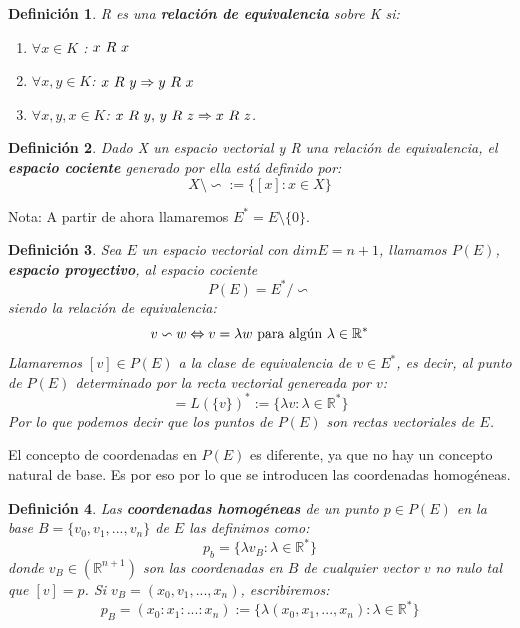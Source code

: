 \documentclass[a4paper,11pt, oneside]{book}
\newtheorem{defi}{Definición}
\begin{document}
\begin{defi}
	R es una \textbf{relación de equivalencia} sobre K si:
	\begin{enumerate}
	\item $\forall x \in K$	: $x\textup{ }R\textup{ }x$
	\item $\forall x,y \in K$: $x\textup{ }R\textup{ }y \Rightarrow y\textup{ }R\textup{ }x$
	\item $\forall x,y,x \in K$: $x\textup{ }R\textup{ }y \textup{, } y\textup{ }R\textup{ }z \Rightarrow x\textup{ }R\textup{ }z$.
	\end{enumerate}
\end{defi}

\begin{defi}
	Dado X un espacio vectorial y R una relación de equivalencia, el \textbf{espacio cociente} generado por ella está definido por:
	\begin{equation}
		X \setminus \backsim := \{[x]: x \in X\}
	\end{equation}
\end{defi}



Nota: A partir de ahora llamaremos $E^* = E \setminus \{0\}$.
\begin{defi}
	Sea $E$ un espacio vectorial con $dim E=n+1$, llamamos $P(E)$, \textbf{espacio proyectivo}, al espacio cociente
	\begin{equation}
		P(E) = E^* / \backsim
	\end{equation}
	siendo la relación de equivalencia:
	\begin{equation}
		v \backsim w \Leftrightarrow v = \lambda w \textup{ para algún } \lambda \in \mathbb R^* 
	\end{equation}
	Llamaremos $[v] \in P(E)$ a la clase de equivalencia de $v \in E^*$, es decir, al punto de $P(E)$ determinado por la recta vectorial genereada por $v$:
	\begin{equation}
		[v] = L(\{v\})^* := \{\lambda v: \lambda \in \mathbb R^*\}
	\end{equation}
	Por lo que podemos decir que los puntos de $P(E)$ son rectas vectoriales de $E$.
\end{defi}

El concepto de coordenadas en $P(E)$ es diferente, ya que no hay un concepto natural de base. Es por eso por lo que se introducen las coordenadas homogéneas.
\begin{defi}
	Las \textbf{coordenadas homogéneas} de un punto $p \in P(E)$ en la base $B = \{v_0,v_1,...,v_n\}$ de $E$ las definimos como:
	\begin{equation}
		p_b = \{\lambda v_B: \lambda \in \mathbb R^*\}
	\end{equation}
	donde $v_B \in (\mathbb R^{n+1})$ son las coordenadas en $B$ de cualquier vector $v$ no nulo tal que $[v] = p$. Si $v_B = (x_0,v_1,...,x_n)$, escribiremos:
	\begin{equation}
		p_B = (x_0:x_1:...:x_n) := \{\lambda(x_0,x_1,...,x_n): \lambda \in \mathbb R^*\}
	\end{equation}
\end{defi}
\end{document}
